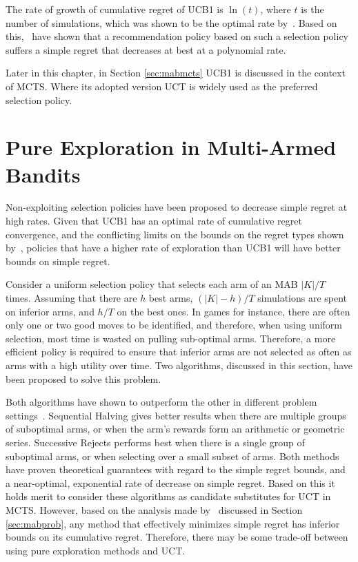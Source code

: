 \documentclass{kecsmstr}
\begin{document}
The rate of growth of cumulative regret of UCB1 is $\ln(t)$, where $t$ is the number of simulations, which was shown to be the optimal rate by~. Based on this,~ have shown that a recommendation policy based on such a selection policy suffers a simple regret that decreases at best at a polynomial rate. 

Later in this chapter, in Section \ref{sec:mabmcts} UCB1 is discussed in the context of MCTS. Where its adopted version UCT is widely used as the preferred selection policy.
\newpage
\section{Pure Exploration in Multi-Armed Bandits}
\label{sec:pureexplmab}
Non-exploiting selection policies have been proposed to decrease simple regret at high rates. Given that UCB1 has an optimal rate of cumulative regret convergence, and the conflicting limits on the bounds on the regret types shown by~, policies that have a higher rate of exploration than UCB1 will have better bounds on simple regret. 

Consider a uniform selection policy that selects each arm of an MAB $|K|/T$ times. Assuming that there are $h$ best arms, $(|K|-h)/T$ simulations are spent on inferior arms, and $h/T$ on the best ones. In games for instance, there are often only one or two good moves to be identified, and therefore, when using uniform selection, most time is wasted on pulling sub-optimal arms. Therefore, a more efficient policy is required to ensure that inferior arms are not selected as often as arms with a high utility over time. Two algorithms, discussed in this section, have been proposed to solve this problem.

Both algorithms have shown to outperform the other in different problem settings~. Sequential Halving gives better results when there are multiple groups of suboptimal arms, or when the arm's rewards form an arithmetic or geometric series. Successive Rejects performs best when there is a single group of suboptimal arms, or when selecting over a small subset of arms. Both methods have proven theoretical guarantees with regard to the simple regret bounds, and a near-optimal, exponential rate of decrease on simple regret. Based on this it holds merit to consider these algorithms as candidate substitutes for UCT in MCTS. However, based on the analysis made by~ discussed in Section \ref{sec:mabprob}, any method that effectively minimizes simple regret has inferior bounds on its cumulative regret. Therefore, there may be some trade-off between using pure exploration methods and UCT.
\end{document}

